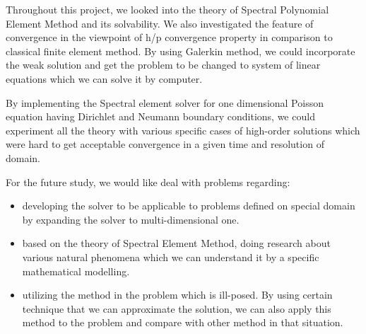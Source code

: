 
Throughout this project, we looked into the theory of Spectral Polynomial Element Method and its solvability. We also investigated the feature of convergence in the viewpoint of h/p convergence property in comparison to classical finite element method. By using Galerkin method, we could incorporate the weak solution and get the problem to be changed to system of linear equations which we can solve it by computer.

By implementing the Spectral element solver for one dimensional
Poisson equation having Dirichlet and Neumann boundary conditions,
we could experiment all the theory with various specific cases of
high-order solutions which were hard to get acceptable convergence
in a given time and resolution of domain.

For the future study, we would like deal with problems regarding:

\begin{itemize}
\item
developing the solver to be applicable to problems defined on special domain by expanding the solver to multi-dimensional one.
\item
based on the theory of Spectral Element Method, doing research about various natural phenomena which we can understand it by a specific mathematical modelling.
\item
utilizing the method in the problem which is ill-posed. By using certain technique that we can approximate the solution, we can also apply this method to the problem and compare with other method in that situation.
\end{itemize}
